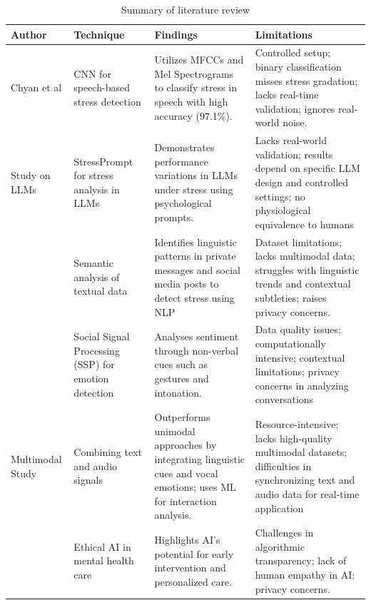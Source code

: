 \documentclass[Arial,12pt,openright,twoside]{book}
\begin{document}
 \begin{table}[H]
\centering
\caption{Summary of literature review}
\label{tab:correlation_table}
\begin{tabular}{|p{1.8cm}|p{2.8cm}|p{4.3cm}|p{4.3cm}|}
\hline
 Author & Technique & Findings & Limitations \\ \hline
 Chyan et al\cite{chyan2022}  & CNN for speech-based stress detection & Utilizes MFCCs and Mel Spectrograms to classify stress in speech with high accuracy (97.1\%). & Controlled setup; binary classification misses stress gradation; lacks real-time validation; ignores real-world noise.\\ \hline
 Study on LLMs \cite{teye2022} & StressPrompt for stress analysis in LLMs & Demonstrates performance variations in LLMs under stress using psychological prompts. & Lacks real-world validation; results depend on specific LLM design and controlled settings; no physiological equivalence to humans\\ \hline
\cite{yoon2020} & Semantic analysis of textual data & Identifies linguistic patterns in private messages and social media posts to detect stress using NLP & Dataset limitations; lacks multimodal data; struggles with linguistic trends and contextual subtleties; raises privacy concerns.\\ \hline
\cite{singh2019} & Social Signal Processing (SSP) for emotion detection & Analyses sentiment through non-verbal cues such as gestures and intonation. & Data quality issues; computationally intensive; contextual limitations; privacy concerns in analyzing conversations\\ \hline
 Multimodal Study \cite{razavi2024} & Combining text and audio signals & Outperforms unimodal approaches by integrating linguistic cues and vocal emotions; uses ML for interaction analysis. & Resource-intensive; lacks high-quality multimodal datasets; difficulties in synchronizing text and audio data for real-time application\\ \hline
 \cite{teye2022} & Ethical AI in mental health care & Highlights AI’s potential for early intervention and personalized care. & Challenges in algorithmic transparency; lack of human empathy in AI; privacy concerns. \\ \hline %
\end{tabular}
\end{table}
\vspace{-5mm} %
\end{document}
